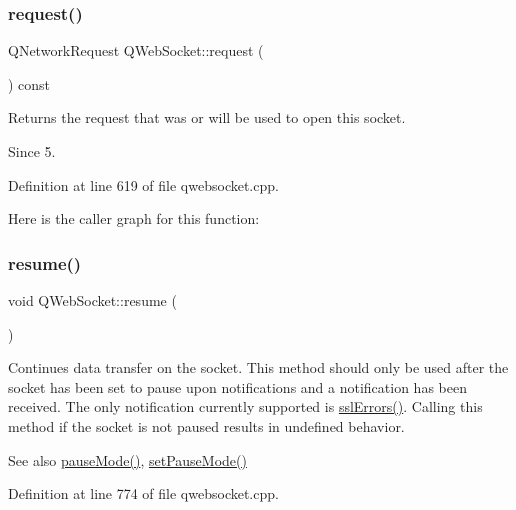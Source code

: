 \subsubsection{\texorpdfstring{request()}{request()}}
{\footnotesize\ttfamily Q\+Network\+Request Q\+Web\+Socket\+::request (\begin{DoxyParamCaption}{ }\end{DoxyParamCaption}) const}



Returns the request that was or will be used to open this socket. 

\begin{DoxySince}{Since}
5. 
\end{DoxySince}


Definition at line 619 of file qwebsocket.\+cpp.

Here is the caller graph for this function\+:
\mbox{\label{class_q_web_socket_af21dbd52b116cc5dae811548000001ee}} 
\subsubsection{\texorpdfstring{resume()}{resume()}}
{\footnotesize\ttfamily void Q\+Web\+Socket\+::resume (\begin{DoxyParamCaption}{ }\end{DoxyParamCaption})}

Continues data transfer on the socket. This method should only be used after the socket has been set to pause upon notifications and a notification has been received. The only notification currently supported is \mbox{\hyperlink{class_q_web_socket_ae0d3eebd5b595e4e869d2ad6cef45ed7}{ssl\+Errors()}}. Calling this method if the socket is not paused results in undefined behavior.

\begin{DoxySeeAlso}{See also}
\mbox{\hyperlink{class_q_web_socket_a15778b8a5f6ffb83c61b5e9b1701eb28}{pause\+Mode()}}, \mbox{\hyperlink{class_q_web_socket_a7d6650c827cace4ccb27988894872bcc}{set\+Pause\+Mode()}} 
\end{DoxySeeAlso}


Definition at line 774 of file qwebsocket.\+cpp.

\mbox{\label{class_q_web_socket_aa56992d89ffba061ec6dc7c3e4a010f6}} 

